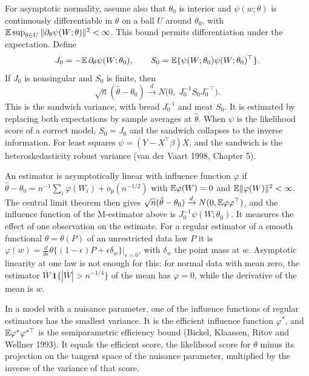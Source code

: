 For asymptotic normality, assume also that $\theta_0$ is interior and $\psi(w; \theta)$ is continuously differentiable in $\theta$ on a ball $U$ around $\theta_0$, with $\mathbb{E}\sup_{\theta \in U}\|\partial_\theta\psi(W; \theta)\|^2 < \infty$. This bound permits differentiation under the expectation. Define
\[
J_0 = -\mathbb{E}\,\partial_\theta\psi(W; \theta_0), \qquad S_0 = \mathbb{E}\{\psi(W; \theta_0)\psi(W; \theta_0)^\top\}.
\]
If $J_0$ is nonsingular and $S_0$ is finite, then
\[
\sqrt{n}(\hat\theta - \theta_0) \xrightarrow{d} N\bigl(0,\; J_0^{-1}S_0J_0^{-\top}\bigr).
\]
This is the sandwich variance, with bread $J_0^{-1}$ and meat $S_0$. It is estimated by replacing both expectations by sample averages at $\hat\theta$. When $\psi$ is the likelihood score of a correct model, $S_0 = J_0$ and the sandwich collapses to the inverse information. For least squares $\psi = (Y - X^\top\beta)X$, and the sandwich is the heteroskedasticity robust variance (van der Vaart 1998, Chapter 5).

An estimator is asymptotically linear with influence function $\varphi$ if $\hat\theta - \theta_0 = n^{-1}\sum_i\varphi(W_i) + o_p(n^{-1/2})$ with $\mathbb{E}\varphi(W) = 0$ and $\mathbb{E}\|\varphi(W)\|^2 < \infty$. The central limit theorem then gives $\sqrt{n}(\hat\theta - \theta_0) \xrightarrow{d} N(0, \mathbb{E}\varphi\varphi^\top)$, and the influence function of the M-estimator above is $J_0^{-1}\psi(W; \theta_0)$. It measures the effect of one observation on the estimate. For a regular estimator of a smooth functional $\theta = \theta(P)$ of an unrestricted data law $P$ it is $\varphi(w) = \frac{d}{d\epsilon}\theta\{(1 - \epsilon)P + \epsilon\delta_w\}\big|_{\epsilon = 0}$, with $\delta_w$ the point mass at $w$. Asymptotic linearity at one law is not enough for this: for normal data with mean zero, the estimator $\bar W\,\mathbf{1}\{|\bar W| > n^{-1/4}\}$ of the mean has $\varphi = 0$, while the derivative of the mean is $w$.

In a model with a nuisance parameter, one of the influence functions of regular estimators has the smallest variance. It is the efficient influence function $\varphi^*$, and $\mathbb{E}\varphi^*\varphi^{*\top}$ is the semiparametric efficiency bound (Bickel, Klaassen, Ritov and Wellner 1993). It equals the efficient score, the likelihood score for $\theta$ minus its projection on the tangent space of the nuisance parameter, multiplied by the inverse of the variance of that score.

